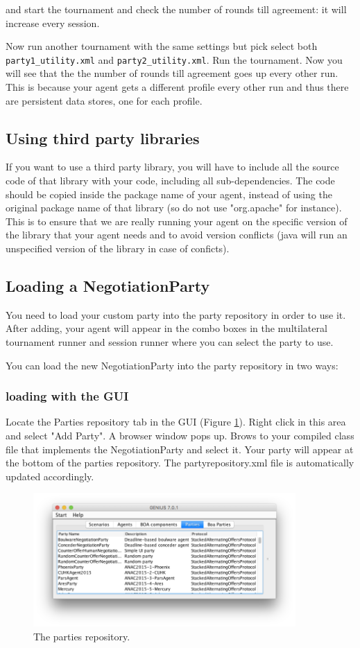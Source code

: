 \documentclass[]{article}
\begin{document}
and start the tournament and check the number of rounds till agreement: it will increase every session.

Now run another tournament with the same settings but pick select both \verb|party1_utility.xml| and \verb|party2_utility.xml|. Run the tournament.
Now you will see that the the number of rounds till agreement goes up every other run. This is because your agent gets a different profile every other run and thus there are persistent data stores, one for each profile. 
\subsection{Using third party libraries}

If you want to use a third party library, you will have to include all the source code of that library with your code, including all sub-dependencies. The code should be copied inside the package name of your agent, instead of using the original package name of that library (so do not use "org.apache" for instance). This is to ensure that we are really running your agent on the specific version of the library that your agent needs and to avoid version conflicts (java will run an unspecified version of the library in case of conficts). 


\subsection{Loading a NegotiationParty}

You need to load your custom party into the party repository in order to use it. After adding, your agent will appear in the combo boxes in the multilateral tournament runner and session runner where you can select the party to use.

You can load the new NegotiationParty into the party repository in two ways:
\subsubsection{loading with the GUI}
Locate the Parties repository tab in the GUI (Figure \ref{fig:partiesrepo}). Right click in this area and select "Add Party". A browser window pops up. Brows to  your compiled class file that implements the NegotiationParty and select it. Your party will appear at the bottom of the parties repository. The partyrepository.xml file is automatically updated accordingly.

\begin{figure}[h!] 
	\center
	\includegraphics[width=10cm]{media/partiesrepo.png}
	\caption{The parties repository.}
	\label{fig:partiesrepo}
\end{figure}
\end{document}
